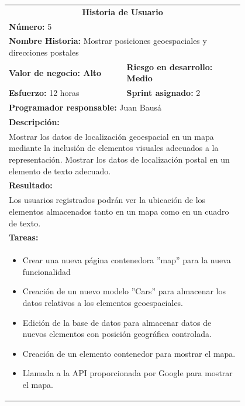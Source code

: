 	\begin{table}[H]
	  \centering 
	 	\begin{tabular}{p{0.4\linewidth}p{0.4\linewidth}}
	    \toprule
	    \multicolumn{2}{c}{\cellcolor{black!30}\textbf{Historia de Usuario}} 													\\
		\multicolumn{2}{l}{\cellcolor{gray!25}\textbf{Número: }5}																\\
		\multicolumn{2}{l}{\textbf{Nombre Historia: } Mostrar posiciones geoespaciales y direcciones postales}				\\
		\cellcolor{gray!25}\textbf{Valor de negocio: Alto}	&	\cellcolor{gray!25}\textbf{Riesgo en desarrollo: Medio}		\\
		\textbf{Esfuerzo:} 12 horas				&	\textbf{Sprint asignado: }2 												\\
		\multicolumn{2}{l}{\cellcolor{gray!25}\textbf{Programador responsable: }Juan Bausá}									\\
		\multicolumn{2}{l}{\textbf{Descripción:}}                                                     						\\
		\multicolumn{2}{l}{\parbox{15cm}{Mostrar los datos de localización geoespacial en un mapa mediante la inclusión de elementos visuales adecuados a la representación. Mostrar los datos de localización postal en un elemento de texto adecuado.}}				\\
		\multicolumn{2}{l}{\cellcolor{gray!25}\textbf{Resultado:}}																\\		
		\multicolumn{2}{l}{\parbox{15cm}{Los usuarios registrados podrán ver la ubicación de los elementos almacenados tanto en un mapa como en un cuadro de texto.}}																									\\
		\multicolumn{2}{l}{\textbf{Tareas:}}																					\\
		\multicolumn{2}{l}{
			\begin{minipage}{12cm}
	    		\vskip 4pt
	    		\begin{itemize}
	    			\item Crear una nueva página contenedora ''map'' para la nueva funcionalidad
	    			\item Creación de un nuevo modelo ''Cars'' para almacenar los datos relativos a los elementos geoespaciales.
	    			\item Edición de la base de datos para almacenar datos de nuevos elementos con posición geográfica controlada.
	    			\item Creación de un elemento contenedor para mostrar el mapa.
	    			\item Llamada a la API proporcionada por Google para mostrar el mapa.

\end{itemize}
\end{minipage}}
\end{tabular}
\end{table}
